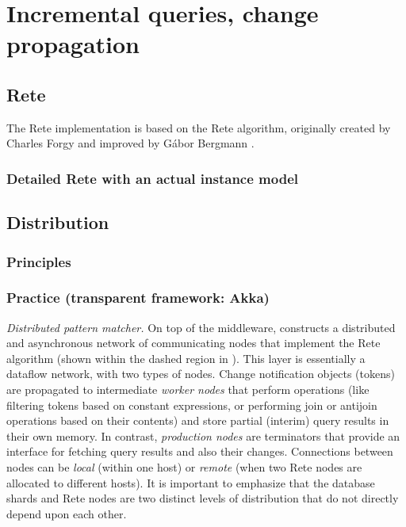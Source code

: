 \section{Incremental queries, change propagation}
\label{sec:incrementality}


\subsection{Rete}

The Rete implementation is based on the Rete algorithm, originally created by Charles Forgy \cite{Forgy} and improved by Gábor Bergmann \cite{BergmannRete}.


\subsubsection{Detailed Rete with an actual instance model}






\subsection{Distribution}


\subsubsection{Principles}


\subsubsection{Practice (transparent framework: Akka)}





\emph{Distributed pattern matcher.}\label{distributed_pattern_matcher}
On top of the middleware, \iqd{} constructs a distributed and asynchronous network of communicating nodes that implement the Rete~\cite{Forgy} algorithm (shown within the dashed region in ). %
This layer is essentially a dataflow network, with two types of nodes. Change notification objects (tokens) are propagated to intermediate \emph{worker nodes} that perform operations (like filtering tokens based on constant expressions, or performing join or antijoin operations based on their contents) and
store partial (interim) query results in their own memory. In contrast, \emph{production nodes} are terminators that provide an interface for fetching query results and also their changes. Connections between nodes can be \emph{local} (within one host) or \emph{remote} (when two Rete nodes are allocated to different hosts). It is important to emphasize that the database shards and Rete nodes are two distinct levels of distribution that do not directly depend upon each other.



